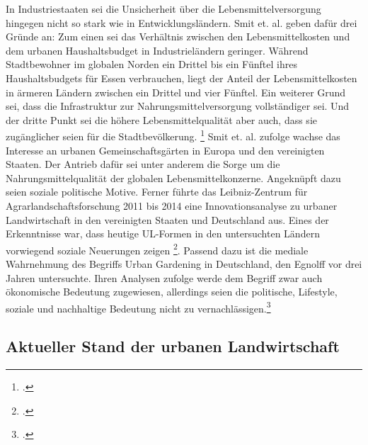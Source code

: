 \documentclass{scrartcl}
\begin{document}
In Industriestaaten sei die Unsicherheit über die Lebensmittelversorgung hingegen nicht so stark wie in Entwicklungsländern. Smit et. al. geben dafür drei Gründe an: Zum einen sei das Verhältnis zwischen den Lebensmittelkosten und dem urbanen Haushaltsbudget in Industrieländern geringer. Während Stadtbewohner im globalen Norden ein Drittel bis ein Fünftel ihres Haushaltsbudgets für Essen verbrauchen, liegt der Anteil der Lebensmittelkosten in ärmeren Ländern zwischen ein Drittel und vier Fünftel. Ein weiterer Grund sei, dass die Infrastruktur zur Nahrungsmittelversorgung vollständiger sei. Und der dritte Punkt sei die höhere Lebensmittelqualität aber auch, dass sie zugänglicher seien für die Stadtbevölkerung. \footcites[Vgl.][S.27]{SmitUrbanToday} Smit et. al. zufolge wachse das Interesse an urbanen Gemeinschaftsgärten in Europa und den vereinigten Staaten. Der Antrieb dafür sei unter anderem die Sorge um die Nahrungsmittelqualität der globalen Lebensmittelkonzerne. Angeknüpft dazu seien soziale politische Motive. Ferner führte das Leibniz-Zentrum für Agrarlandschaftsforschung 2011 bis 2014 eine Innovationsanalyse zu urbaner Landwirtschaft in den vereinigten Staaten und Deutschland aus. Eines der Erkenntnisse war, dass heutige UL-Formen in den untersuchten Ländern vorwiegend soziale Neuerungen zeigen \footcite{Berges2014UrbaneStadt}. Passend dazu ist die mediale Wahrnehmung des Begriffs Urban Gardening in Deutschland, den Egnolff vor drei Jahren untersuchte. Ihren Analysen zufolge werde dem Begriff zwar auch ökonomische Bedeutung zugewiesen, allerdings seien die politische, Lifestyle, soziale und nachhaltige Bedeutung nicht zu vernachlässigen.\footcite[Vgl.][S.119ff]{Egnolff2015DieIdeal}



\subsection{Aktueller Stand der urbanen Landwirtschaft}
\end{document}
